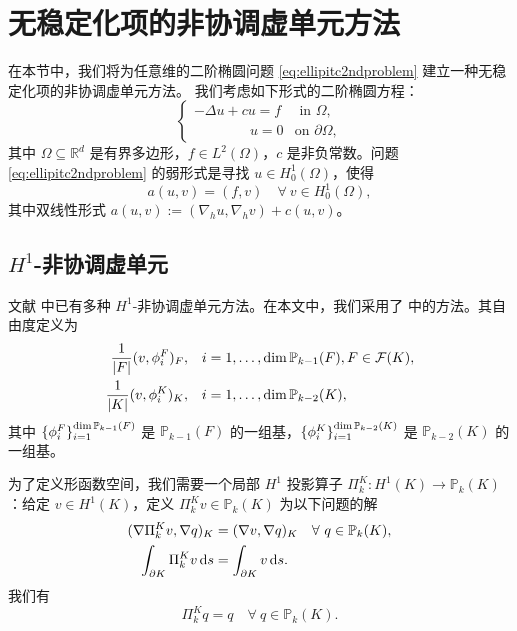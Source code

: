 \section{无稳定化项的非协调虚单元方法}\label{sec:stabfreencfmvem}

在本节中，我们将为任意维的二阶椭圆问题 \eqref{eq:ellipitc2ndproblem} 
建立一种无稳定化项的非协调虚单元方法。
我们考虑如下形式的二阶椭圆方程：
\begin{equation}\label{eq:ellipitc2ndproblem}
\begin{cases}
    -\Delta u + c u=f & \textrm{ in } \Omega,\\
\qquad\qquad u=0 & \textrm{on } \partial\Omega,
\end{cases}
\end{equation}
其中 $\Omega\subseteq\mathbb R^d$ 是有界多边形，$f\in L^2(\Omega)$，$c$ 是非负常数。问题 \eqref{eq:ellipitc2ndproblem} 的弱形式是寻找 $u\in H_0^1(\Omega)$，使得
\begin{equation}\label{eq:ellipitc2ndproblemweakform}
a(u,v)=(f,v)\quad\forall~v\in H_0^1(\Omega),
\end{equation}
其中双线性形式 $a(u, v):=(\nabla_h u, \nabla_h v)+c(u,v)$。

\subsection{$H^1$-非协调虚单元}
文献
\cite{AyusodeDiosLipnikovManzini2016,CangianiManziniSutton2017,ChenHuang2020ncvem,Huang2020}
中已有多种 $H^1$-非协调虚单元方法。在本文中，我们采用了
\cite{CangianiManziniSutton2017,ChenHuang2020ncvem} 中的方法。其自由度定义为
\begin{align}
\frac{1}{|F|}(v, \phi_i^F)_F, & \quad i=1,\ldots, \operatorname{dim}\mathbb P_{k-1}(F), F\in\mathcal F(K), \label{eq:vemdof1}\\
\frac{1}{|K|}(v, \phi_i^K)_K, & \quad i=1,\ldots, \operatorname{dim}\mathbb P_{k-2}(K), \label{eq:vemdof2}
\end{align}
其中 $\{\phi_i^F\}_{i=1}^{\operatorname{dim}\mathbb P_{k-1}(F)}$ 是 $\mathbb P_{k-1}(F)$ 的一组基，$\{\phi_i^K\}_{i=1}^{\operatorname{dim}\mathbb P_{k-2}(K)}$ 是 $\mathbb P_{k-2}(K)$ 的一组基。

为了定义形函数空间，我们需要一个局部 $H^1$ 投影算子 $\Pi_k^K: H^1(K)\to\mathbb
P_k(K)$：给定 $v\in H^1(K)$，定义 $\Pi_k^Kv\in\mathbb P_k(K)$ 为以下问题的解
\begin{align}
(\nabla\Pi_k^Kv, \nabla q)_K&=(\nabla v, \nabla q)_K\quad  \forall~q\in \mathbb P_k(K), \label{eq:projlocal2d1}\\
\int_{\partial K}\Pi_k^Kv\,{\rm d}s&=\int_{\partial K}v\,{\rm d}s. \label{eq:projlocal2d2}
\end{align}
我们有
\begin{equation}\label{eq:localproj2dprop1}
\Pi_k^Kq=q \quad\forall~q\in\mathbb P_k(K).
\end{equation}

